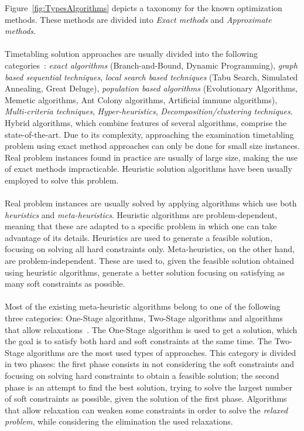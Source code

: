 Figure~\ref{fig:TypesAlgorithms} depicts a taxonomy for the known optimization methods. These methods are divided into \textit{Exact methods} and \textit{Approximate methods}.\\
\\
Timetabling solution approaches are usually divided into the following categories~\cite{Qu2009}: \textit{exact algorithms} (Branch-and-Bound, Dynamic Programming), \textit{graph based sequential techniques}, \textit{local search based techniques} (Tabu Search, Simulated Annealing, Great Deluge), \textit{population based algorithms} (Evolutionary Algorithms, Memetic algorithms, Ant Colony algorithms, Artificial immune algorithms), \textit{Multi-criteria techniques}, \textit{Hyper-heuristics}, \textit{Decomposition/clustering techniques}. Hybrid algorithms, which combine features of several algorithms, comprise the state-of-the-art. Due to its complexity, approaching the examination timetabling problem using exact method approaches can only be done for small size instances. Real problem instances found in practice are usually of large size, making the use of exact methods impracticable. Heuristic solution algorithms have been usually employed to solve this problem.\\
\\
Real problem instances are usually solved by applying algorithms which use both \textit{heuristics} and \textit{meta-heuristics}. Heuristic algorithms are problem-dependent, meaning that these are adapted to a specific problem in which one can take advantage of its details. Heuristics are used to generate a feasible solution, focusing on solving all hard constraints only. Meta-heuristics, on the other hand, are problem-independent. These are used to, given the feasible solution obtained using heuristic algorithms, generate a better solution focusing on satisfying as many soft constraints as possible.\\
\\
Most of the existing meta-heuristic algorithms belong to one of the following three categories: One-Stage algorithms, Two-Stage algorithms and algorithms that allow relaxations~\cite{Lewis2007}. The One-Stage algorithm is used to get a solution, which the goal is to satisfy both hard and soft constraints at the same time. The Two-Stage algorithms are the most used types of approaches. This category is divided in two phases: the first phase consists in not considering the soft constraints and focusing on solving hard constraints to obtain a feasible solution; the second phase is an attempt to find the best solution, trying to solve the largest number of soft constraints as possible, given the solution of the first phase. Algorithms that allow relaxation can weaken some constraints in order to solve the \textit{relaxed problem}, while considering the elimination the used relaxations.

